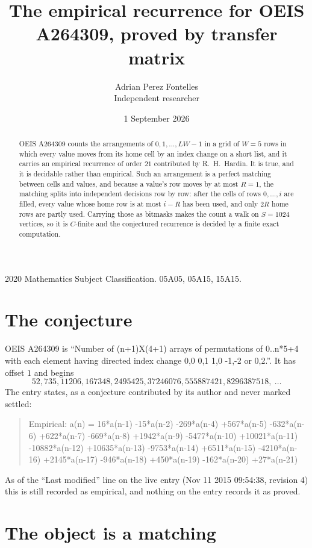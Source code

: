 \documentclass[11pt,a4paper]{article}
\title{The empirical recurrence for OEIS A264309, proved by transfer matrix}
\author{Adrian Perez Fontelles\\ \small Independent researcher}
\date{1 September 2026}
\theoremstyle{plain}
\theoremstyle{definition}
\begin{document}
\maketitle

\begin{abstract}
OEIS A264309 counts the arrangements of $0,1,\dots,LW-1$ in a grid of $W=5$ rows in which
every value moves from its home cell by an index change on a short list, and it carries an
empirical recurrence of order $21$ contributed by R.~H.~Hardin. It is true, and it is
decidable rather than empirical. Such an arrangement is a perfect matching between cells and
values, and because a value's row moves by at most $R=1$, the matching splits into
independent decisions row by row: after the cells of rows $0,\dots,i$ are filled,
every value whose home row is at most $i-R$ has been used, and only $2R$ home rows are
partly used. Carrying those as bitmasks makes the count a walk on $S=1024$ vertices, so it is
$C$-finite and the conjectured recurrence is decided by a finite exact computation.
\end{abstract}

\noindent\small 2020 Mathematics Subject Classification. 05A05, 05A15, 15A15.\normalsize

\section{The conjecture}

OEIS A264309 is ``Number of (n+1)X(4+1) arrays of permutations of 0..n*5+4 with each element having directed index change 0,0 0,1 1,0 -1,-2 or 0,2.''. It has offset $1$ and begins
\[
52, 735, 11206, 167348, 2495425, 37246076, 555887421, 8296387518,\ \dots
\]
The entry states, as a conjecture contributed by its author and never marked settled:
\begin{quote}
Empirical: a(n) = 16*a(n-1) -15*a(n-2) -269*a(n-4) +567*a(n-5) -632*a(n-6) +622*a(n-7) -669*a(n-8) +1942*a(n-9) -5477*a(n-10) +10021*a(n-11) -10882*a(n-12) +10635*a(n-13) -9753*a(n-14) +6511*a(n-15) -4210*a(n-16) +2145*a(n-17) -946*a(n-18) +450*a(n-19) -162*a(n-20) +27*a(n-21)
\end{quote}
As of the ``Last modified'' line on the live entry (Nov 11 2015 09:54:38, revision 4) this is still
recorded as empirical, and nothing on the entry records it as proved.

\section{The object is a matching}
\end{document}
